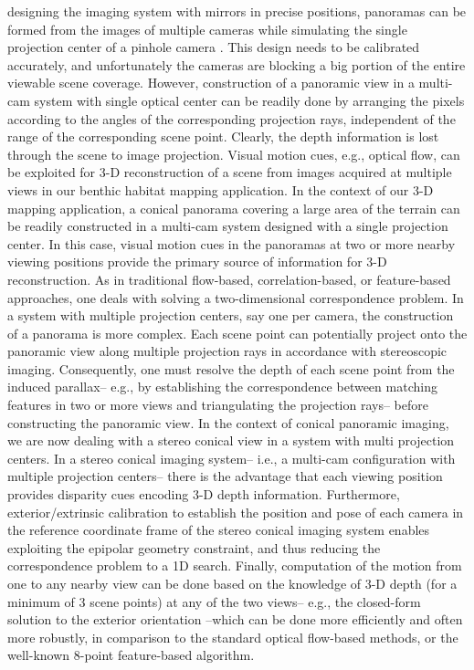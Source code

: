 designing the imaging system with mirrors in precise positions, panoramas can be formed from the
images of multiple cameras while simulating the single projection center of a pinhole camera
\cite{nal98}. This design needs to be calibrated accurately, and unfortunately the cameras are
blocking a big portion of the entire viewable scene coverage. However, construction of a panoramic
view in a multi-cam system with single optical center can be readily done by arranging the pixels
according to the angles of the corresponding projection rays, independent of the range of the
corresponding scene point. Clearly, the depth information is lost through the scene to image
projection. Visual motion cues, e.g., optical flow, can be exploited for 3-D reconstruction of a
scene from images acquired at multiple views in our benthic habitat mapping application. In the
context of our 3-D mapping application, a conical panorama covering a large area of the terrain can
be readily constructed in a multi-cam system designed with a single projection center. In this
case, visual motion cues in the panoramas at two or more nearby viewing positions provide the
primary source of information for 3-D reconstruction. As in traditional flow-based,
correlation-based, or feature-based approaches, one deals with solving a two-dimensional
correspondence problem. In a system with multiple projection centers, say one per camera, the
construction of a panorama is more complex. Each scene point can potentially project onto the
panoramic view along multiple projection rays in accordance with stereoscopic imaging.
Consequently, one must resolve the depth of each scene point from the induced parallax-- e.g., by
establishing the correspondence between matching features in two or more views and triangulating
the projection rays-- before constructing the panoramic view. In the context of conical panoramic
imaging, we are now dealing with a stereo conical view in a system with multi projection centers.
In a stereo conical imaging system-- i.e., a multi-cam configuration with multiple projection
centers-- there is the advantage that each viewing position provides disparity cues encoding 3-D
depth information. Furthermore, exterior/extrinsic calibration to establish the position and pose
of each camera in the reference coordinate frame of the stereo conical imaging system enables
exploiting the epipolar geometry constraint, and thus reducing the correspondence problem to a 1D
search. Finally, computation of the motion from one to any nearby view can be done based on the
knowledge of 3-D depth (for a minimum of 3 scene points) at any of the two views-- e.g., the
closed-form solution to the exterior orientation \cite{hor87-1,hor87-2,mic00} --which can be done
more efficiently \cite{zha04} and often more robustly, in comparison to the standard optical
flow-based methods, or the well-known 8-point feature-based algorithm.


